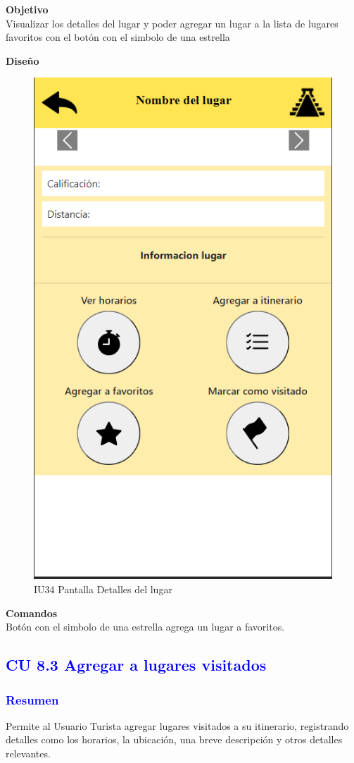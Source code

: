 \textbf{Objetivo} \\
Visualizar los detalles del lugar y poder agregar un lugar a la lista de lugares favoritos con el botón con el simbolo de una estrella

\textbf{Diseño}

    \begin{figure}[h]
        
            \centering
            \includegraphics[width=.4\linewidth]{entregable final/pantallasSistema/IU34 Pantalla Detalles del lugar.png}
        \caption{IU34 Pantalla Detalles del lugar}
    
    \end{figure}
\pagebreak
\textbf{Comandos} \\
Botón con el simbolo de una estrella agrega un lugar a favoritos.


\vspace{20cm}
\subsection{\textcolor{blue}{CU 8.3 Agregar a lugares visitados}}
\subsubsection{\textcolor{blue}{Resumen}}
Permite al Usuario Turista agregar lugares visitados a su itinerario, registrando detalles como los horarios, la ubicación, una breve descripción y otros detalles relevantes.


